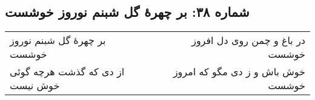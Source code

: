 \begin{center}
\section*{شماره ۳۸: بر چهرۀ گل شبنم نوروز خوشست}
\label{sec:038}
\begin{longtable}{l p{0.5cm} r}
بر چهرهٔ گل شبنم نوروز خوشست
&&
در باغ و چمن روی دل افروز خوشست
\\
از دی که گذشت هرچه گوئی خوش نیست
&&
خوش باش و ز دی مگو که امروز خوشست
\\
\end{longtable}
\end{center}
